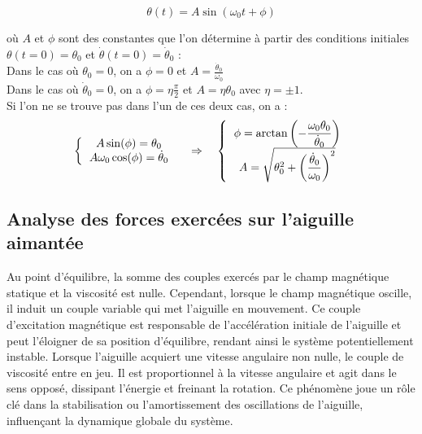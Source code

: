 \documentclass[a4paper,12pt,twoside]{article}
\begin{document}
\begin{equation}
    \theta(t) = A\sin(\omega_0t+\phi)
\end{equation}

\noindent où $A$ et $\phi$ sont des constantes que l'on détermine à partir des conditions initiales $\theta(t=0) = \theta_0$ et $\dot{\theta}(t=0) = \dot{\theta}_0$ :\\
Dans le cas où  $\theta_0 = 0$, on a $\phi = 0$ et $A = \frac{\dot{\theta}_0}{\omega_0}$ \\
Dans le cas où $\dot{\theta}_0 = 0$, on a $\phi =\eta \frac{\pi}{2}$ et $A = \eta\theta_0$ avec $\eta = \pm 1$. \\
Si l'on ne se trouve pas dans l'un de ces deux cas, on a :
\begin{equation}
    \left\{ \begin{tabular}{c}
      $A\sin(\phi)=\theta_0$     \\
      $A\omega_0\cos(\phi)=\dot{\theta}_0$ 
    \end{tabular}
    \right.
    \quad\Rightarrow\quad
    \left\{ \begin{tabular}{c}
      $\phi=\displaystyle\arctan\left(-\frac{\omega_0 
 \theta_0}{\dot{\theta}_0}\right)$     \\
      $A = \displaystyle\sqrt{\theta_0^2 + \left(\frac{\dot{\theta}_0}{\omega_0}\right)^2}$
    \end{tabular}
    \right.
\end{equation}

\subsection{Analyse des forces exercées sur l'aiguille aimantée}

Au point d'équilibre, la somme des couples exercés par le champ magnétique statique et la viscosité est nulle. Cependant, lorsque le champ magnétique oscille, il induit un couple variable qui met l'aiguille en mouvement. Ce couple d'excitation magnétique est responsable de l'accélération initiale de l'aiguille et peut l'éloigner de sa position d'équilibre, rendant ainsi le système potentiellement instable. Lorsque l'aiguille acquiert une vitesse angulaire non nulle, le couple de viscosité entre en jeu. Il est proportionnel à la vitesse angulaire et agit dans le sens opposé, dissipant l'énergie et freinant la rotation. Ce phénomène joue un rôle clé dans la stabilisation ou l’amortissement des oscillations de l’aiguille, influençant la dynamique globale du système.
\end{document}
